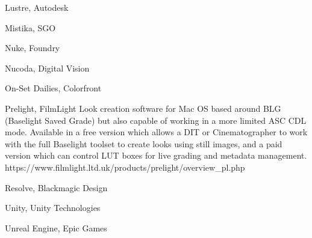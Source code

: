 Lustre, Autodesk

Mistika, SGO

Nuke, Foundry

Nucoda, Digital Vision

On-Set Dailies, Colorfront

Prelight, FilmLight
Look creation software for Mac OS based around BLG (Baselight Saved Grade) but also capable of working in a more limited ASC CDL mode. Available in a free version which allows a DIT or Cinematographer to work with the full Baselight toolset to create looks using still images, and a paid version which can control LUT boxes for live grading and metadata management. https://www.filmlight.ltd.uk/products/prelight/overview_pl.php

Resolve, Blackmagic Design

Unity, Unity Technologies

Unreal Engine, Epic Games

